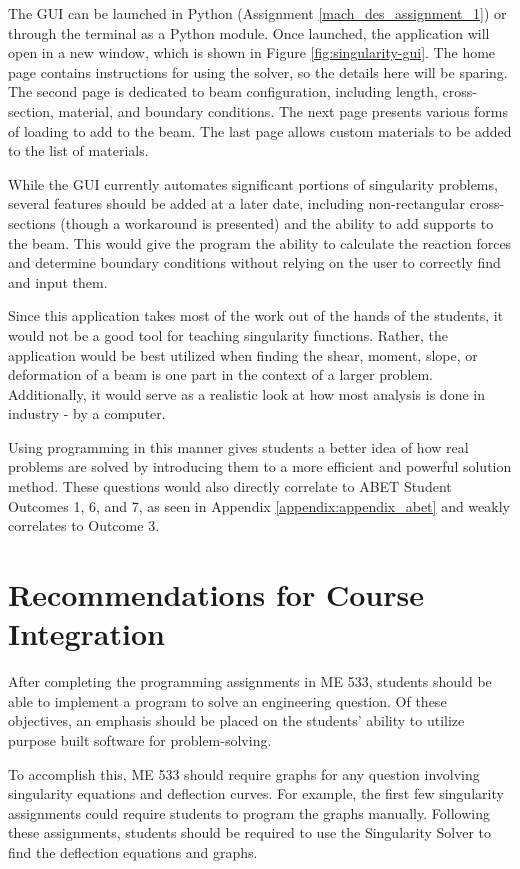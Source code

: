 The GUI can be launched in Python (Assignment \ref{mach_des_assignment_1}) or through
the terminal as a Python module. Once launched, the application will open in a new window, which is shown
in Figure \ref{fig:singularity-gui}. The home page contains instructions for using the solver, so the details 
here will be sparing. The second page is dedicated to beam configuration, including length, cross-section, 
material, and boundary conditions. The next page presents various forms of loading to add
to the beam. The last page allows custom materials to be added to the list of materials.

While the GUI currently automates significant portions of singularity problems, several features should be
added at a later date, including non-rectangular cross-sections (though a workaround is presented) and
the ability to add supports to the beam. This would give the program the ability to calculate the reaction
forces and determine boundary conditions without relying on the user to correctly find and input them.

Since this application takes most of the work out of the hands of the students, it would not be a good tool
for teaching singularity functions. Rather, the application would be best utilized when finding the shear,
moment, slope, or deformation of a beam is one part in the context of a larger problem. Additionally, 
it would serve as a realistic look at how most analysis is done in industry - by a computer.

Using programming in this manner gives students a better idea of how real problems are solved by
introducing them to a more efficient and powerful solution method. These questions would also 
directly correlate to ABET Student Outcomes 1, 6, and 7, as seen in Appendix 
\ref{appendix:appendix_abet} and weakly correlates to Outcome 3.

\section{Recommendations for Course Integration}

After completing the programming assignments in ME 533, students should be able to implement a program to solve 
an engineering question. Of these objectives, an emphasis should be placed on the students' ability to utilize
purpose built software for problem-solving.

To accomplish this, ME 533 should require graphs for any question involving singularity equations and deflection
curves. For example, the first few singularity assignments could require students to program the graphs manually.
Following these assignments, students should be required to use the Singularity Solver to find the deflection 
equations and graphs.

